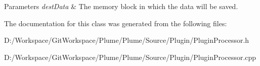\begin{DoxyParams}{Parameters}
{\em dest\+Data} & The memory block in which the data will be saved. \\
\hline
\end{DoxyParams}


The documentation for this class was generated from the following files\+:\begin{DoxyCompactItemize}
\item 
D\+:/\+Workspace/\+Git\+Workspace/\+Plume/\+Plume/\+Source/\+Plugin/Plugin\+Processor.\+h\item 
D\+:/\+Workspace/\+Git\+Workspace/\+Plume/\+Plume/\+Source/\+Plugin/Plugin\+Processor.\+cpp\end{DoxyCompactItemize}
